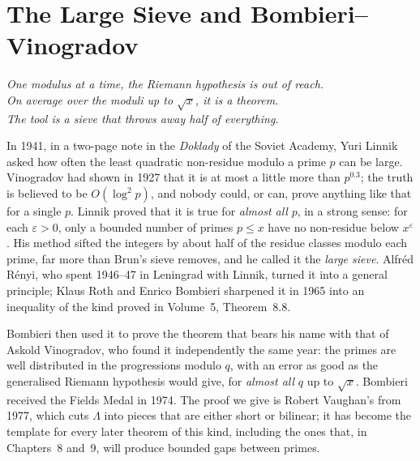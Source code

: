 \chapter{The Large Sieve and Bombieri--Vinogradov}
\begin{center}\itshape
One modulus at a time, the Riemann hypothesis is out of reach.\\
On average over the moduli up to $\sqrt x$, it is a theorem.\\
The tool is a sieve that throws away half of everything.
\end{center}

In 1941, in a two-page note in the \emph{Doklady} of the Soviet Academy, Yuri Linnik asked how often the least quadratic non-residue modulo a prime $p$ can be large. Vinogradov had shown in 1927 that it is at most a little more than $p^{0.3}$; the truth is believed to be $O(\log^2p)$, and nobody could, or can, prove anything like that for a single $p$. Linnik proved that it is true for \emph{almost all} $p$, in a strong sense: for each $\varepsilon>0$, only a bounded number of primes $p\le x$ have no non-residue below $x^\varepsilon$. His method sifted the integers by about half of the residue classes modulo each prime, far more than Brun's sieve removes, and he called it the \emph{large sieve}. Alfréd Rényi, who spent 1946--47 in Leningrad with Linnik, turned it into a general principle; Klaus Roth and Enrico Bombieri sharpened it in 1965 into an inequality of the kind proved in Volume~5, Theorem~8.8.

Bombieri then used it to prove the theorem that bears his name with that of Askold Vinogradov, who found it independently the same year: the primes are well distributed in the progressions modulo $q$, with an error as good as the generalised Riemann hypothesis would give, for \emph{almost all} $q$ up to $\sqrt x$. Bombieri received the Fields Medal in 1974. The proof we give is Robert Vaughan's from 1977, which cuts $\Lambda$ into pieces that are either short or bilinear; it has become the template for every later theorem of this kind, including the ones that, in Chapters~8 and~9, will produce bounded gaps between primes.

